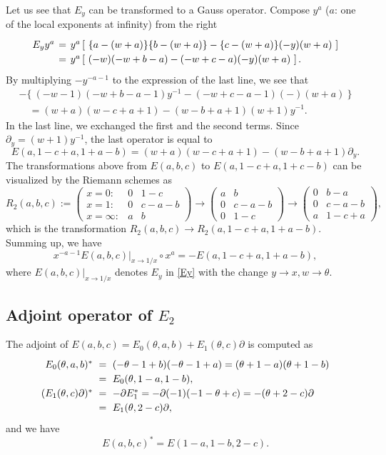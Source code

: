 \documentclass[a4paper,12pt]{article}
\theoremstyle{definition}
\theoremstyle{remark}
\numberwithin{equation}{section} %
\begin{document}
Let us see that $E_y$ can be transformed to a Gauss operator. Compose $y^a$ ($a$: one of the local exponents at infinity) from the right 
\[\def\arraystretch{1.2}\setlength\arraycolsep{2pt} \begin{array}{rcl}
E_y y^a&=&y^a\left[\ \{a-(w+a)\}\{b-(w+a)\}-\{c-(w+a)\}(-y)(w+a)\ \right]\\
    &=&y^a\left[\ (-w)(-w+b-a)-(-w+c-a)(-y)(w+a)\ \right].\end{array}
\]
By multiplying $-y^{-a-1}$ to the expression of the last line, we see that 
\[
\begin{array}{l} -\{\ (-w-1)(-w+b-a-1)y^{-1}-(-w+c-a-1)(-)(w+a)\ \}\\
    \quad =(w+a)(w-c+a+1)-(w-b+a+1)(w+1)y^{-1}.\end{array}
\]
 In the last line, we exchanged the first and the second terms. 
Since $\partial_{y}=(w+1)y^{-1}$, the last operator is equal to 
$$E(a,1-c+a,1+a-b)= (w+a)(w-c+a+1)-(w-b+a+1)\partial_{y}.$$
The transformations above from $E(a,b,c)$ to
         $E(a,1-c+a,1+c-b)$ can be visualized by the Riemann schemes as
\[R_2(a,b,c):=
\left(\begin{array}{ccc}
x=0:& 0&1-c\\
x=1:& 0&c-a-b\\
x=\infty:& a&b\end{array}\right)
\to
\left(\begin{array}{cc}
a&b\\
0&c-a-b\\
0&1-c
\end{array}\right)
\to
\left(\begin{array}{cc}
0&b-a\\
0&c-a-b\\
a&1-c+a
\end{array}\right),
\]
\noindent
which is the transformation $R_2(a,b,c)\to R_2(a,1-c+a,1+a-b)$.
Summing up, we have
$$x^{-a-1}E(a,b,c)|_{x\to1/x}\circ x^a=-E(a,1-c+a,1+a-b),$$
where $E(a,b,c)|_{x\to1/x}$ denotes $E_y$ in \eqref{Ey}
with the change $y\to x, w\to \theta$.

\subsection{Adjoint operator of $E_2$}\label{adjE2proof}
The adjoint of $E(a,b,c)=E_0(\theta,a,b)+E_1(\theta,c)\partial$ is computed as
\[\def\arraystretch{1.2}\setlength\arraycolsep{3pt} \begin{array}{rcl}
   E_0(\theta,a,b)^*&=&(-\theta-1+b)(-\theta-1+a)=(\theta+1-a)(\theta+1-b)\\ 
   &=&E_0(\theta,1-a,1-b),\\
(E_1(\theta,c)\partial)^*&=&-\partial E_1^*=-\partial(-1)(-1-\theta+c)=-(\theta+2-c)\partial\\
  &=&E_1(\theta,2-c)\partial,\end{array}\]
and we have
\[E(a,b,c)^*=E(1-a,1-b,2-c).\]
\end{document}
